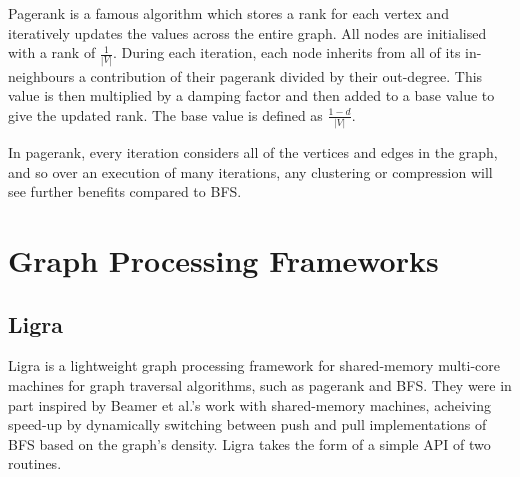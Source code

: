 Pagerank is a famous algorithm which stores a rank for each vertex and iteratively updates the values
across the entire graph. All nodes are initialised with a rank of $\frac{1}{|V|}$. During each
iteration, each node inherits from all of its in-neighbours a contribution of their pagerank divided
by their out-degree. This value is then multiplied by a damping factor and then added to a base value
to give the updated rank. The base value is defined as $\frac{1 - d}{|V|}$.

In pagerank, every iteration considers all of the vertices and edges in the graph, and so over
an execution of many iterations, any clustering or compression will see further benefits compared to
BFS.

\section{Graph Processing Frameworks}

\subsection{Ligra}

Ligra is a lightweight graph processing framework for shared-memory multi-core machines for graph
traversal algorithms, such as pagerank and BFS. They were in part inspired by Beamer et al.'s work
with shared-memory machines, acheiving speed-up by dynamically switching between push and pull implementations of BFS based on the graph's density. Ligra takes the form of a simple API of two
routines.

